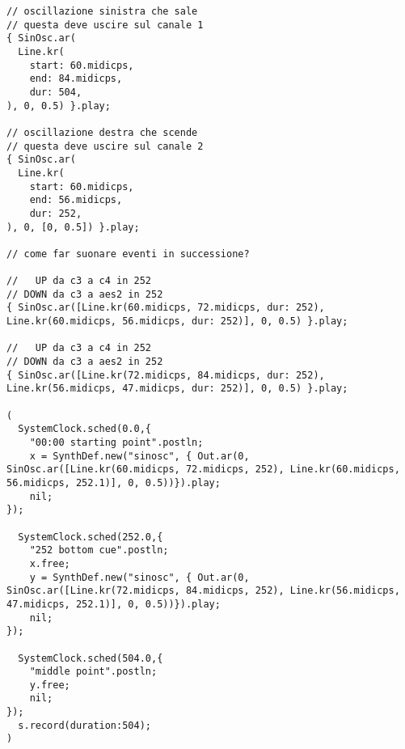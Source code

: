 \begin{lstlisting}
// oscillazione sinistra che sale
// questa deve uscire sul canale 1
{ SinOsc.ar(
  Line.kr(
    start: 60.midicps,
    end: 84.midicps,
    dur: 504,
), 0, 0.5) }.play;

// oscillazione destra che scende
// questa deve uscire sul canale 2
{ SinOsc.ar(
  Line.kr(
    start: 60.midicps,
    end: 56.midicps,
    dur: 252,
), 0, [0, 0.5]) }.play;

// come far suonare eventi in successione?

//   UP da c3 a c4 in 252
// DOWN da c3 a aes2 in 252
{ SinOsc.ar([Line.kr(60.midicps, 72.midicps, dur: 252), Line.kr(60.midicps, 56.midicps, dur: 252)], 0, 0.5) }.play;

//   UP da c3 a c4 in 252
// DOWN da c3 a aes2 in 252
{ SinOsc.ar([Line.kr(72.midicps, 84.midicps, dur: 252), Line.kr(56.midicps, 47.midicps, dur: 252)], 0, 0.5) }.play;

(
  SystemClock.sched(0.0,{
    "00:00 starting point".postln;
    x = SynthDef.new("sinosc", { Out.ar(0, SinOsc.ar([Line.kr(60.midicps, 72.midicps, 252), Line.kr(60.midicps, 56.midicps, 252.1)], 0, 0.5))}).play;
    nil;
});

  SystemClock.sched(252.0,{
    "252 bottom cue".postln;
    x.free;
    y = SynthDef.new("sinosc", { Out.ar(0, SinOsc.ar([Line.kr(72.midicps, 84.midicps, 252), Line.kr(56.midicps, 47.midicps, 252.1)], 0, 0.5))}).play;
    nil;
});

  SystemClock.sched(504.0,{
    "middle point".postln;
    y.free;
    nil;
});
  s.record(duration:504);
)
\end{lstlisting}

